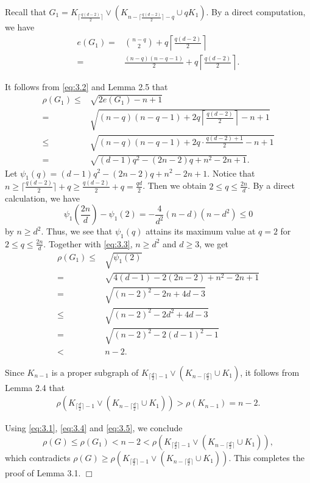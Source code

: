 \documentclass[10pt]{article}
\numberwithin{equation}{section}
\begin{document}
Recall that $G_1=K_{\lceil\frac{q(d-2)}{2}\rceil}\vee(K_{n-\lceil\frac{q(d-2)}{2}\rceil-q}\cup qK_1)$. By a direct computation, we have
\begin{align}\label{eq:3.2}
e(G_1)=&\binom{n-q}{2}+q\left\lceil\frac{q(d-2)}{2}\right\rceil\nonumber\\
=&\frac{(n-q)(n-q-1)}{2}+q\left\lceil\frac{q(d-2)}{2}\right\rceil.
\end{align}

It follows from \eqref{eq:3.2} and Lemma 2.5 that
\begin{align}\label{eq:3.3}
\rho(G_1)\leq&\sqrt{2e(G_1)-n+1}\nonumber\\
=&\sqrt{(n-q)(n-q-1)+2q\left\lceil\frac{q(d-2)}{2}\right\rceil-n+1}\nonumber\\
\leq&\sqrt{(n-q)(n-q-1)+2q\cdot\frac{q(d-2)+1}{2}-n+1}\nonumber\\
=&\sqrt{(d-1)q^{2}-(2n-2)q+n^{2}-2n+1}.
\end{align}
Let $\psi_1(q)=(d-1)q^{2}-(2n-2)q+n^{2}-2n+1$. Notice that $n\geq\lceil\frac{q(d-2)}{2}\rceil+q\geq\frac{q(d-2)}{2}+q=\frac{qd}{2}$. Then we
obtain $2\leq q\leq\frac{2n}{d}$. By a direct calculation, we have
$$
\psi_1\left(\frac{2n}{d}\right)-\psi_1(2)=-\frac{4}{d^{2}}(n-d)(n-d^{2})\leq0
$$
by $n\geq d^{2}$. Thus, we see that $\psi_1(q)$ attains its maximum value at $q=2$ for $2\leq q\leq\frac{2n}{d}$. Together with \eqref{eq:3.3},
$n\geq d^{2}$ and $d\geq3$, we get
\begin{align}\label{eq:3.4}
\rho(G_1)\leq&\sqrt{\psi_1(2)}\nonumber\\
=&\sqrt{4(d-1)-2(2n-2)+n^{2}-2n+1}\nonumber\\
=&\sqrt{(n-2)^{2}-2n+4d-3}\nonumber\\
\leq&\sqrt{(n-2)^{2}-2d^{2}+4d-3}\nonumber\\
=&\sqrt{(n-2)^{2}-2(d-1)^{2}-1}\nonumber\\
<&n-2.
\end{align}

Since $K_{n-1}$ is a proper subgraph of $K_{\lceil\frac{d}{2}\rceil-1}\vee(K_{n-\lceil\frac{d}{2}\rceil}\cup K_1)$, it follows from Lemma 2.4
that
\begin{align}\label{eq:3.5}
\rho(K_{\lceil\frac{d}{2}\rceil-1}\vee(K_{n-\lceil\frac{d}{2}\rceil}\cup K_1))>\rho(K_{n-1})=n-2.
\end{align}

Using \eqref{eq:3.1}, \eqref{eq:3.4} and \eqref{eq:3.5}, we conclude
$$
\rho(G)\leq\rho(G_1)<n-2<\rho(K_{\lceil\frac{d}{2}\rceil-1}\vee(K_{n-\lceil\frac{d}{2}\rceil}\cup K_1)),
$$
which contradicts $\rho(G)\geq\rho(K_{\lceil\frac{d}{2}\rceil-1}\vee(K_{n-\lceil\frac{d}{2}\rceil}\cup K_1))$. This completes the proof of
Lemma 3.1. \hfill $\Box$
\end{document}
